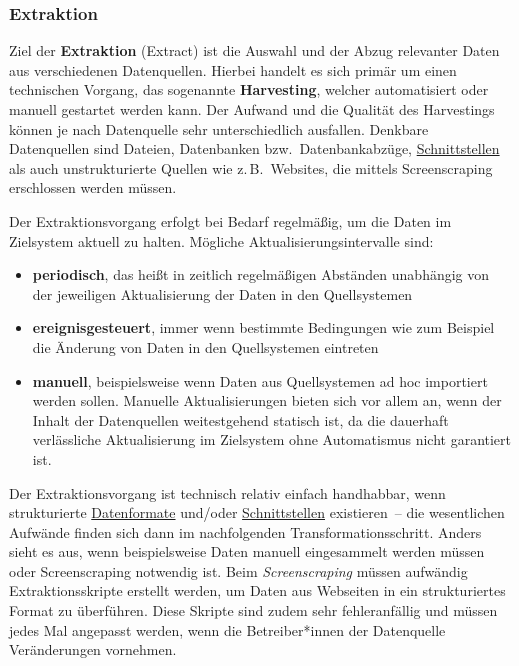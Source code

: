 \documentclass[
  11pt,
  letterpaper,
  DIV=11,
  twoside]{scrreprt}
\begin{document}
\subsubsection{Extraktion}\label{extraktion}

Ziel der \textbf{Extraktion} (Extract) ist die Auswahl und der Abzug
relevanter Daten aus verschiedenen Datenquellen. Hierbei handelt es sich
primär um einen technischen Vorgang, das sogenannte \textbf{Harvesting},
welcher automatisiert oder manuell gestartet werden kann. Der Aufwand
und die Qualität des Harvestings können je nach Datenquelle sehr
unterschiedlich ausfallen. Denkbare Datenquellen sind Dateien,
Datenbanken bzw.~Datenbankabzüge,
\hyperref[schnittstellen]{Schnittstellen} als auch unstrukturierte
Quellen wie z.\,B.~Websites, die mittels Screenscraping erschlossen
werden müssen.

Der Extraktionsvorgang erfolgt bei Bedarf regelmäßig, um die Daten im
Zielsystem aktuell zu halten. Mögliche Aktualisierungsintervalle sind:

\begin{itemize}
\item
  \textbf{periodisch}, das heißt in zeitlich regelmäßigen Abständen
  unabhängig von der jeweiligen Aktualisierung der Daten in den
  Quellsystemen
\item
  \textbf{ereignisgesteuert}, immer wenn bestimmte Bedingungen wie zum
  Beispiel die Änderung von Daten in den Quellsystemen eintreten
\item
  \textbf{manuell}, beispielsweise wenn Daten aus Quellsystemen ad hoc
  importiert werden sollen. Manuelle Aktualisierungen bieten sich vor
  allem an, wenn der Inhalt der Datenquellen weitestgehend statisch ist,
  da die dauerhaft verlässliche Aktualisierung im Zielsystem ohne
  Automatismus nicht garantiert ist.
\end{itemize}

Der Extraktionsvorgang ist technisch relativ einfach handhabbar, wenn
strukturierte \hyperref[datenformate]{Datenformate} und/oder
\hyperref[schnittstellen]{Schnittstellen} existieren~-- die wesentlichen
Aufwände finden sich dann im nachfolgenden Transformationsschritt.
Anders sieht es aus, wenn beispielsweise Daten manuell eingesammelt
werden müssen oder Screenscraping notwendig ist. Beim
\emph{Screenscraping} müssen aufwändig Extraktionsskripte erstellt
werden, um Daten aus Webseiten in ein strukturiertes Format zu
überführen. Diese Skripte sind zudem sehr fehleranfällig und müssen
jedes Mal angepasst werden, wenn die Betreiber*innen der Datenquelle
Veränderungen vornehmen.
\end{document}
